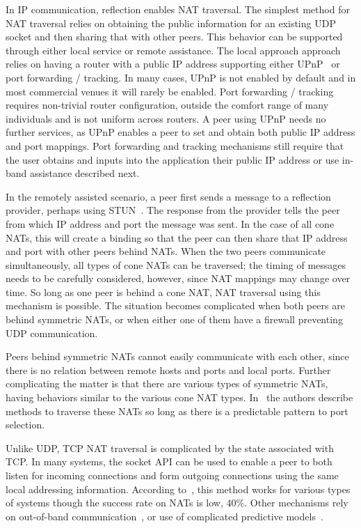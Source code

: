 In IP communication, reflection enables NAT traversal.  The simplest method for
NAT traversal relies on obtaining the public information for an existing UDP
socket and then sharing that with other peers.  This behavior can be supported
through either local service or remote assistance.  The local approach approach
relies on having a router with a public IP address supporting either
UPnP~\cite{upnp} or port forwarding / tracking.  In many cases, UPnP is not
enabled by default and in most commercial venues it will rarely be enabled.
Port forwarding / tracking requires non-trivial router configuration, outside
the comfort range of many individuals and is not uniform across routers.  A
peer using UPnP needs no further services, as UPnP enables a peer to set and
obtain both public IP address and port mappings.  Port forwarding and tracking
mechanisms still require that the user obtains and inputs into the application
their public IP address or use in-band assistance described next.

In the remotely assisted scenario, a peer first sends a message to a reflection
provider, perhaps using STUN~\cite{stun_rfc}.  The response from the provider
tells the peer from which IP address and port the message was sent.  In the
case of all cone NATs, this will create a binding so that the peer can then
share that IP address and port with other peers behind NATs.  When the two
peers communicate simultaneously, all types of cone NATs can be traversed; the
timing of messages needs to be carefully considered, however, since NAT
mappings may change over time.  So long as one peer is behind a cone NAT, NAT
traversal using this mechanism is possible.  The situation becomes complicated
when both peers are behind symmetric NATs, or when either one of them have a
firewall preventing UDP communication.

Peers behind symmetric NATs cannot easily communicate with each other, since
there is no relation between remote hosts and ports and local ports.  Further
complicating the matter is that there are various types of symmetric NATs,
having behaviors similar to the various cone NAT types. In~\cite{ice} the
authors describe methods to traverse these NATs so long as there is a
predictable pattern to port selection.  

Unlike UDP, TCP NAT traversal is complicated by the state associated with TCP.
In many systems, the socket API can be used to enable a peer to both listen for
incoming connections and form outgoing connections using the same local
addressing information.  According to~\cite{ice-tcp}, this method works for
various types of systems though the success rate on NATs is low, 40\%.  Other
mechanisms rely on out-of-band communication~\cite{pvc}, or use of complicated
predictive models~\cite{tcp-hole-punching}.

